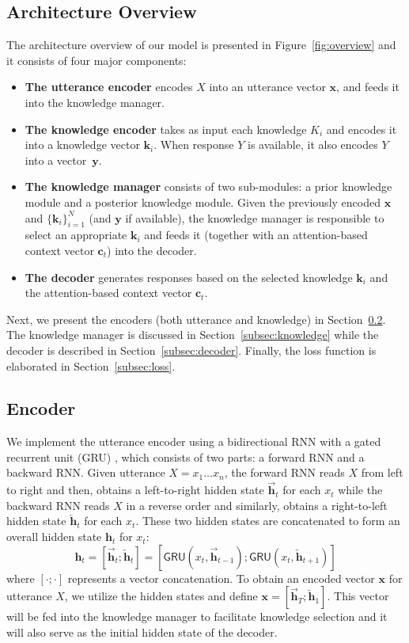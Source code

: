 \documentclass{article}
\begin{document}
\subsection{Architecture Overview}
The architecture overview of our model is presented in Figure~\ref{fig:overview}
and it consists of four major components:

\begin{itemize}
    \item \textbf{The utterance encoder} encodes $X$ into an utterance vector $\mathbf{x}$, 
    and feeds it into the knowledge manager.
    \item \textbf{The knowledge encoder} takes as input each knowledge $K_i$ and encodes it into a knowledge vector $\mathbf{k}_i$. 
    When response $Y$ is available, 
    it also encodes $Y$ into a vector~$\mathbf{y}$.
    \item \textbf{The knowledge manager} consists of two sub-modules: a prior knowledge module and a posterior knowledge module.
    Given the previously encoded $\mathbf{x}$ and $\{\mathbf{k}_i\}_{i=1}^N$ (and $\mathbf{y}$ if available),
    the knowledge manager is responsible to select an appropriate $\mathbf{k}_i$ and feeds it 
    (together with an attention-based context vector $\mathbf{c}_t$) into the decoder.
    \item \textbf{The decoder} generates responses based on the selected knowledge $\mathbf{k}_i$ and the attention-based context vector $\mathbf{c}_t$.
\end{itemize}

Next,
we present the encoders (both utterance and knowledge) in Section~\ref{subsec:encoder}.
The knowledge manager is discussed in Section~\ref{subsec:knowledge} while 
the decoder is described in Section~\ref{subsec:decoder}.
Finally, the loss function is elaborated in Section~\ref{subsec:loss}.
\fi

\subsection{Encoder}
\label{subsec:encoder}
We implement the utterance encoder 
using a bidirectional RNN with a gated recurrent unit (GRU) \cite{cho2014properties},
which consists of two parts: a forward RNN and a backward RNN.
Given utterance $X = x_1\ldots x_n$,
the forward RNN reads $X$ from left to right and then,
obtains a left-to-right hidden state $\overrightarrow{\mathbf{h}}_t$ for each $x_t$
while 
the backward RNN reads $X$ in a reverse order and similarly,
obtains a right-to-left hidden state $\overleftarrow{\mathbf{h}}_t$ for each $x_t$.
These two hidden states are concatenated to form an overall hidden state $\mathbf{h}_t$ for $x_t$:
$$\mathbf{h}_t = [\overrightarrow{\mathbf{h}}_t; \overleftarrow{\mathbf{h}}_t] = [\mathsf{GRU}(x_t, \overrightarrow{\mathbf{h}}_{t-1}); \mathsf{GRU}(x_t, \overleftarrow{\mathbf{h}}_{t+1})]$$
where
$[\cdot; \cdot]$ represents a vector concatenation. 
To obtain an encoded vector $\mathbf{x}$ for utterance $X$,
we utilize the hidden states and define $\mathbf{x} = [\overrightarrow{\mathbf{h}}_T ; \overleftarrow{\mathbf{h}}_1]$.
This vector will be fed into the knowledge manager to facilitate knowledge selection
and it will also serve as the initial hidden state of the decoder.
\end{document}
